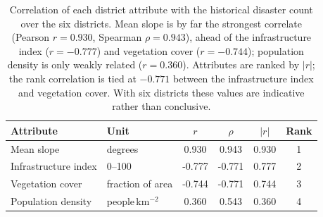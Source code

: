 \begin{table}[htbp]
  \centering
  \caption{Correlation of each district attribute with the historical disaster count over the
  six districts. Mean slope is by far the strongest correlate (Pearson $r = 0.930$,
  Spearman $\rho = 0.943$), ahead of the infrastructure index ($r = -0.777$) and
  vegetation cover ($r = -0.744$); population density is only weakly related
  ($r = 0.360$). Attributes are ranked by $|r|$; the rank correlation is tied at
  $-0.771$ between the infrastructure index and vegetation cover. With six districts
  these values are indicative rather than conclusive.}
  \label{tab:disaster-correlates}
  \begin{tabular}{l l S[table-format=-1.3] S[table-format=-1.3] S[table-format=1.3] c}
    \toprule
    Attribute & Unit & {$r$} & {$\rho$} & {$|r|$} & {Rank} \\
    \midrule
    Mean slope           & degrees           &  0.930 &  0.943 & 0.930 & 1 \\
    Infrastructure index & 0--100            & -0.777 & -0.771 & 0.777 & 2 \\
    Vegetation cover     & fraction of area  & -0.744 & -0.771 & 0.744 & 3 \\
    Population density   & people\,km$^{-2}$ &  0.360 &  0.543 & 0.360 & 4 \\
    \bottomrule
  \end{tabular}
\end{table}
